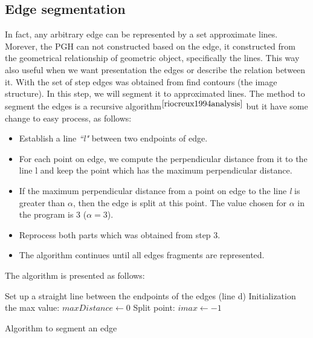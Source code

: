 \subsection{Edge segmentation}
In fact, any arbitrary edge can be represented by a set approximate lines. Morever, the PGH can not constructed based on the edge, it constructed from the geometrical relationship of geometric object, specifically the lines. This way also useful when we want presentation the edges or describe the relation between it. With the set of step edges was obtained from find contours (the image structure). In this step, we will segment it to approximated lines. The method to segment the edges is a recursive algorithm$^{\cite{riocreux1994analysis}}$ but it have some change to easy process, as follows:
\begin{itemize}
\item Establish a line \textit{``l"} between two endpoints of edge.
\item For each point on edge, we compute the perpendicular distance from it to the line l and keep the point which has the maximum perpendicular distance.
\item If the maximum perpendicular distance from a point on edge to the line \textit{l} is greater than $\alpha$, then the edge is split at this point. The value chosen for $\alpha$ in the program is 3 ($\alpha = 3$).
\item Reprocess both parts which was obtained from step 3.
\item The algorithm continues until all edges fragments are represented.
\end{itemize}
The algorithm is presented as follows:\\
\IncMargin{1em}
\begin{algorithm}[H]
\Indm 
{}
\Indp
Set up a straight line between the endpoints of the edges (line d)\;
Initialization the max value: $maxDistance  \leftarrow 0 $\;
Split point: $imax \leftarrow -1$ \; 
\caption{Algorithm to segment an edge}
\end{algorithm}\DecMargin{1em}
